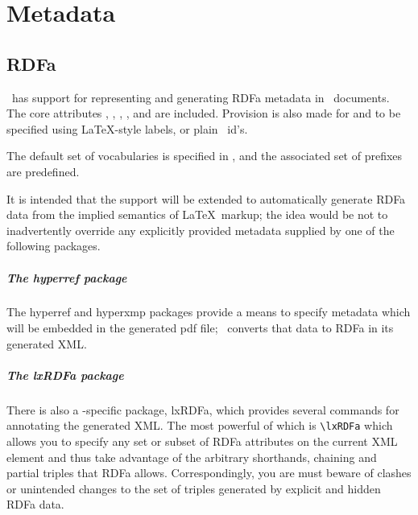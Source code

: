 \documentclass{book}
\begin{document}

\chapter{Metadata}\label{metadata}
\section{RDFa}\label{RDFa}
\LaTeXML\ has support for representing and generating RDFa metadata in \LaTeXML\ documents.
The core attributes , , , 
,  and  are included.
Provision is also made for  and  to be specified
using \LaTeX-style labels, or plain \XML\ id's.


The default set of vocabularies is specified in
,
and the associated set of prefixes are predefined.

It is intended that the support will be extended to automatically
generate RDFa data from the implied semantics of \LaTeX\ markup;
the idea would be not to inadvertently override any explicitly
provided metadata supplied by one of the following packages.

\paragraph{The hyperref package}
The  hyperref and hyperxmp packages provide a means to specify metadata
which will be embedded in the generated pdf file; \LaTeXML\ converts that
data to RDFa in its generated XML.

\paragraph{The lxRDFa package}
There is also a \LaTeXML-specific package, lxRDFa, which provides
several commands for annotating the generated XML.
The most powerful of which is \verb|\lxRDFa| which allows you to specify
any set or subset of RDFa attributes on the current XML element and thus
take advantage of the arbitrary shorthands, chaining and partial triples
that RDFa allows.  Correspondingly, you are must beware of
clashes or unintended changes to the set of triples generated
by explicit and hidden RDFa data.
\end{document}
